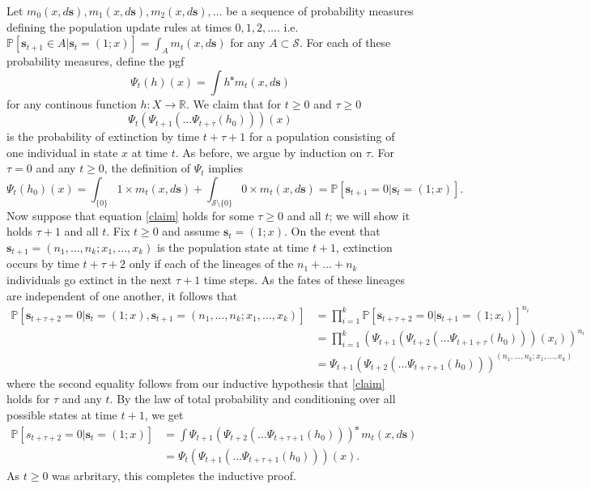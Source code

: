 \documentclass[12pt]{amsart}\usepackage[]{graphicx}\usepackage[]{color}
\def\R{\mathbb R}
\def\P{\mathbb P}
\def\S{\mathcal S}
\def\s{\mathbf s}
\begin{document}
Let $m_0(x,d\s),m_1(x,d\s),m_2(x,d\s),\dots$ be a sequence of probability measures defining the population update rules at times $0,1,2,\dots.$ i.e. $\P[\s_{t+1}\in A| \s_t =(1;x)]=\int_A m_t(x, d\s)$ for any $A\subset \S$. For each of these probability measures, define the pgf
\[
\Psi_t(h)(x)=\int h^\s m_t(x,d\s)
\]
for any continous function $h:X\to\R$. We claim that for $t\ge 0$ and $\tau\ge 0$
\begin{equation}\label{claim}
\Psi_{t}(\Psi_{t+1}(\dots \Psi_{t+\tau}(h_0)))(x)
\end{equation}
is the probability of extinction by time $t+\tau+1$ for a population consisting of one individual in state $x$ at time $t$. As before, we argue by induction on $\tau$. For $\tau=0$ and any $t\ge 0$, the definition of $\Psi_t$ implies
\begin{equation}\label{starstarstar}
\Psi_t(h_0)(x)=\int_{\{0\}} 1\times m_t(x, d\s)+\int_{\S\setminus \{0\}} 0\times m_t(x,d\s)= \P[\s_{t+1}=0|\s_t=(1;x)].
\end{equation}
Now suppose that equation \eqref{claim} holds for some $\tau\ge 0$ and all $t$; we will show it holds $\tau+1$ and all $t$. Fix $t\ge 0$ and assume $\s_t=(1;x)$.  On the event that $\s_{t+1}=(n_1, \dots, n_k;x_1, \dots, x_k)$ is the population state at time $t+1$, extinction occurs by time $t+\tau+2$ only if each of the lineages of the $n_1+\dots +n_k$ individuals go extinct in the next $\tau+1$ time steps. As the fates of these lineages are independent of one another, it follows that
\[
\begin{aligned}
\P[\s_{t+\tau+2}=0|\s_{t}=(1; x), \s_{t+1}=(n_1, \dots, n_k;x_1, \dots, x_k)]&= \prod_{i=1}^k \P[\s_{t+\tau+2}=0|\s_{t+1}=(1; x_i)]^{n_i}\\
&=\prod_{i=1}^k\left(\Psi_{t+1}(\Psi_{t+2}(\dots \Psi_{t+1+\tau}(h_0)))(x_i)\right)^{n_i}\\
&=\Psi_{t+1}(\Psi_{t+2}(\dots \Psi_{t+\tau+1}(h_0)))^{(n_1, \dots, n_k;x_1, \dots, x_k)}
\end{aligned}
\]
where the second equality follows from our inductive hypothesis that \eqref{claim} holds for $\tau$ and any $t$. By the law of total probability and conditioning over all possible states at time $t+1$, we get
\[
\begin{aligned}
\P[s_{t+\tau+2}=0|\s_t=(1;x)]&=\int \Psi_{t+1}(\Psi_{t+2}(\dots \Psi_{t+\tau+1}(h_0)))^{\s} \, m_t(x,d\s)\\
&=\Psi_{t}(\Psi_{t+1}(\dots \Psi_{t+\tau+1}(h_0)))(x).
\end{aligned}
\]
As $t\ge 0$ was arbritary, this completes the inductive proof.
\end{document}
